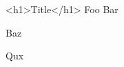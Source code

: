 \documentclass{article}
\begin{document}
\begin{html}
  <h1>Title</h1>
  Foo Bar \par
  Baz \par
  Qux
\end{html}
\end{document}
